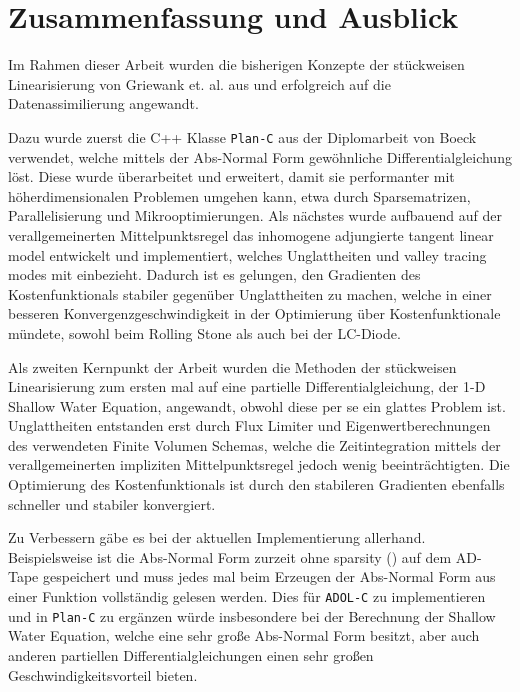 \chapter{Zusammenfassung und Ausblick}

Im Rahmen dieser Arbeit wurden die bisherigen Konzepte der stückweisen Linearisierung von Griewank et. al. aus \cite{monster} und \cite{plan} erfolgreich auf die Datenassimilierung angewandt.

Dazu wurde zuerst die C++ Klasse \texttt{Plan-C} aus der Diplomarbeit von Boeck \cite{boeck14} verwendet, welche mittels der Abs-Normal Form gewöhnliche Differentialgleichung löst. Diese wurde überarbeitet und erweitert, damit sie performanter mit höherdimensionalen Problemen umgehen kann, etwa durch Sparsematrizen, Parallelisierung und Mikrooptimierungen. Als nächstes wurde aufbauend auf der verallgemeinerten Mittelpunktsregel das inhomogene adjungierte tangent linear model entwickelt und implementiert, welches Unglattheiten und valley tracing modes mit einbezieht. Dadurch ist es gelungen, den Gradienten des Kostenfunktionals stabiler gegenüber Unglattheiten zu machen, welche in einer besseren Konvergenzgeschwindigkeit in der Optimierung über Kostenfunktionale mündete, sowohl beim Rolling Stone als auch bei der LC-Diode.

Als zweiten Kernpunkt der Arbeit wurden die Methoden der stückweisen Linearisierung zum ersten mal auf eine partielle Differentialgleichung, der 1-D Shallow Water Equation, angewandt, obwohl diese per se ein glattes Problem ist. Unglattheiten entstanden erst durch Flux Limiter und Eigenwertberechnungen des verwendeten Finite Volumen Schemas, welche die Zeitintegration mittels der verallgemeinerten impliziten Mittelpunktsregel jedoch wenig beeinträchtigten. Die Optimierung des Kostenfunktionals ist durch den stabileren Gradienten ebenfalls schneller und stabiler konvergiert.

Zu Verbessern gäbe es bei der aktuellen Implementierung allerhand. Beispielsweise ist die Abs-Normal Form zurzeit ohne sparsity (\cite[S.137 ff.]{griewank2008evaluating}) auf dem AD-Tape gespeichert und muss jedes mal beim Erzeugen der Abs-Normal Form aus einer Funktion vollständig gelesen werden. Dies für \texttt{ADOL-C} zu implementieren und in \texttt{Plan-C} zu ergänzen  würde insbesondere bei der Berechnung der Shallow Water Equation, welche eine sehr große Abs-Normal Form besitzt, aber auch anderen partiellen Differentialgleichungen einen sehr großen Geschwindigkeitsvorteil bieten. 


